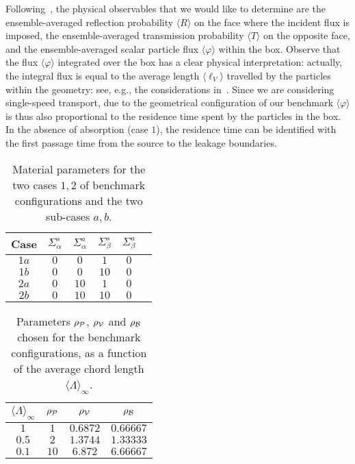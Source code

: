 \documentclass[final,authoryear,5p,times,twocolumn]{elsarticle}
\begin{document}
Following~\cite{brantley_benchmark, larmier_benchmark}, the physical observables that we would like to determine are the ensemble-averaged reflection probability $\langle R \rangle $ on the face where the incident flux is imposed, the ensemble-averaged transmission probability $\langle T \rangle$ on the opposite face, and the ensemble-averaged scalar particle flux $\langle \varphi \rangle $ within the box. Observe that the flux $\langle \varphi \rangle $ integrated over the box has a clear physical interpretation: actually, the integral flux is equal to the average length $\langle \ell_V \rangle$ travelled by the particles within the geometry: see, e.g., the considerations in~\cite{blanco, zoia_cauchy_1, zoia_cauchy_2, zoia_cauchy_3}. Since we are considering single-speed transport, due to the geometrical configuration of our benchmark $\langle \varphi \rangle $ is thus also proportional to the residence time spent by the particles in the box. In the absence of absorption (case $1$), the residence time can be identified with the first passage time from the source to the leakage boundaries.

\begin{table}[t]
\begin{center}
\begin{tabular}{cccccc}
\toprule
Case & $\Sigma_{\alpha}^s$ & $\Sigma_{\alpha}^a$ & $\Sigma_{\beta}^s$ & $\Sigma_{\beta}^a$\\
 \midrule
$1a$ & $0$ & $0$ & $1$ & $0$ \\
$1b$ & $0$ & $0$ & $10$ & $0$ \\
 \midrule
$2a$ & $0$ & $10$ & $1$ & $0$\\
$2b$ & $0$ & $10$ & $10$ & $0$\\
\bottomrule
\end{tabular}
\end{center}
\caption{Material parameters for the two cases $1,2$ of benchmark configurations and the two sub-cases $a,b$.}
\label{tab_compo}
\end{table}

\begin{table}[t]
\begin{center}
\begin{tabular}{cccc}
\toprule
${\langle \Lambda \rangle}_{\infty}$ & $\rho_{\cal P}$ & $\rho_{\cal V}$ & $\rho_{\cal B}$\\
 \midrule
$1$ & $1$ & $0.6872$ & $0.66667$ \\
$0.5$ & $2$ & $1.3744$ & $1.33333$ \\
$0.1$ & $10$ & $6.872$ & $6.66667$\\
\bottomrule
\end{tabular}
\end{center}
\caption{Parameters $\rho_{\cal P}$, $\rho_{\cal V}$ and $\rho_{\cal B}$ chosen for the benchmark configurations, as a function of the average chord length ${\langle \Lambda \rangle}_{\infty}$.}
\label{tab_param_geo}
\end{table}
\end{document}
